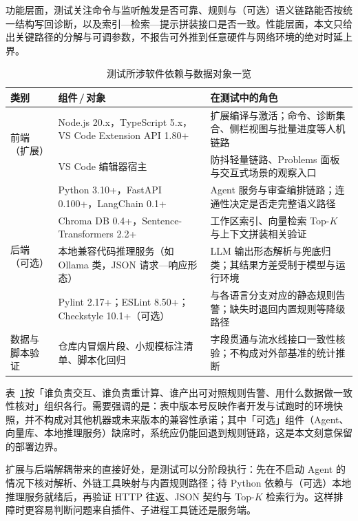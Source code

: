 功能层面，测试关注命令与监听触发是否可靠、规则与（可选）语义链路能否按统一结构写回诊断，以及索引—检索—提示拼装接口是否一致。性能层面，本文只给出关键路径的分解与可调参数，不报告可外推到任意硬件与网络环境的绝对时延上界。

\begin{table}[H]
\centering
\small
\renewcommand{\arraystretch}{1.25}
\setlength{\tabcolsep}{5pt}
\caption{测试所涉软件依赖与数据对象一览}
\label{tab:test-env-stack}
\begin{tabular}{p{2.4cm}p{4.2cm}p{6.5cm}}
\toprule
类别 & 组件\,/\,对象 & 在测试中的角色 \\
\midrule
\multirow{2}{*}{前端（扩展）}
  & Node.js 20.x，TypeScript 5.x，VS Code Extension API 1.80+ &
  扩展编译与激活；命令、诊断集合、侧栏视图与批量进度等人机链路 \\
\cmidrule{2-3}
  & VS Code 编辑器宿主 & 防抖轻量链路、Problems 面板与交互式场景的观察入口 \\
\midrule
\multirow{4}{*}{后端（可选）}
  & Python 3.10+，FastAPI 0.100+，LangChain 0.1+ &
  Agent 服务与审查编排链路；连通性决定是否走完整语义路径 \\
\cmidrule{2-3}
  & Chroma DB 0.4+，Sentence-Transformers 2.2+ &
  工作区索引、向量检索 Top-$K$ 与上下文拼装相关验证 \\
\cmidrule{2-3}
  & 本地兼容代码推理服务（如 Ollama 类，JSON 请求—响应形态）&
  LLM 输出形态解析与兜底归类；其结果方差受制于模型与运行环境 \\
\midrule
外链规则工具 & Pylint 2.17+；ESLint 8.50+；Checkstyle 10.1+（可选） &
  与各语言分支对应的静态规则告警；缺失时退回内置规则等降级路径 \\
\midrule
数据与脚本验证 & 仓库内冒烟片段、小规模标注清单、脚本化回归 &
  字段贯通与流水线接口一致性核验；不构成对外部基准的统计推断 \\
\bottomrule
\end{tabular}
\end{table}

表~\ref{tab:test-env-stack}按「谁负责交互、谁负责重计算、谁产出可对照规则告警、用什么数据做一致性核对」组织各行。需要强调的是：表中版本号反映作者开发与试跑时的环境快照，并不构成对其他机器或未来版本的兼容性承诺；其中「可选」组件（Agent、向量库、本地推理服务）缺席时，系统应仍能回退到规则链路，这是本文刻意保留的部署边界。

扩展与后端解耦带来的直接好处，是测试可以分阶段执行：先在不启动 Agent 的情况下核对解析、外链工具映射与内置规则路径；待 Python 依赖与（可选）本地推理服务就绪后，再验证 HTTP 往返、JSON 契约与 Top-$K$ 检索行为\cite{rfc9110,rfc8259}。这样排障时更容易判断问题来自插件、子进程工具链还是服务端。

